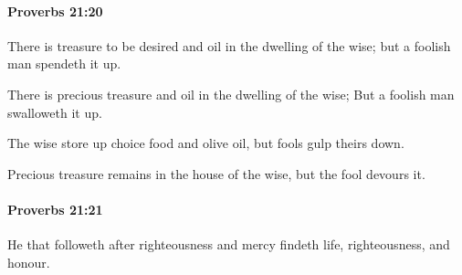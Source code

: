 		\paragraph{Proverbs 21:20} %
			\label{PROVERBS-21-20}

			There is treasure to be desired and oil in the dwelling of the wise; but a foolish man spendeth it up.

			\begin{versebox}
					\item[BHS] 
					\item[ASV] There is precious treasure and oil in the dwelling of the wise; But a foolish man swalloweth it up.
					\item[NIV] The wise store up choice food and olive oil, but fools gulp theirs down.
					\item[NRSV] Precious treasure remains in the house of the wise, but the fool devours it.
			\end{versebox}

		\paragraph{Proverbs 21:21} %
			\label{PROVERBS-21-21}

			He that followeth after righteousness and mercy findeth life, righteousness, and honour.

